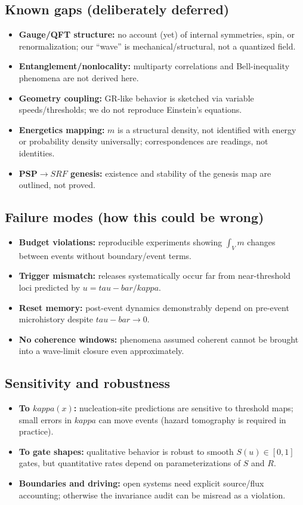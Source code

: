 \documentclass[12pt]{article}
\newcommand{\FoldTime}{\bar{\tau}}
\newcommand{\Threshold}{\kappa}
\newcommand{\Survival}{S}
\newcommand{\Release}{R}
\newcommand{\SRF}{\mathcal{F}_{\mathrm{SR}}}
\def\FoldTime{tau-bar}%
\def\Threshold{kappa}%
\def\SRF{SRF}%
\def\Survival{S}%
\def\Release{R}%
\def\bar#1{#1}%
\def\mathcal#1{#1}%
\def\mathrm#1{#1}%
\begin{document}
\subsection{Known gaps (deliberately deferred)}
\begin{itemize}
  \item \textbf{Gauge/QFT structure:} no account (yet) of internal symmetries, spin, or renormalization; our ``wave'' is mechanical/structural, not a quantized field.
  \item \textbf{Entanglement/nonlocality:} multiparty correlations and Bell-inequality phenomena are not derived here.
  \item \textbf{Geometry coupling:} GR-like behavior is sketched via variable speeds/thresholds; we do not reproduce Einstein's equations.
  \item \textbf{Energetics mapping:} $m$ is a structural density, not identified with energy or probability density universally; correspondences are readings, not identities.
  \item \textbf{PSP$\to\SRF$ genesis:} existence and stability of the genesis map are outlined, not proved.
\end{itemize}

\subsection{Failure modes (how this could be wrong)}
\begin{itemize}
  \item \textbf{Budget violations:} reproducible experiments showing $\int_V m$ changes between events without boundary/event terms.
  \item \textbf{Trigger mismatch:} releases systematically occur far from near-threshold loci predicted by $u=\FoldTime/\Threshold$.
  \item \textbf{Reset memory:} post-event dynamics demonstrably depend on pre-event microhistory despite $\FoldTime\to 0$.
  \item \textbf{No coherence windows:} phenomena assumed coherent cannot be brought into a wave-limit closure even approximately.
\end{itemize}

\subsection{Sensitivity and robustness}
\begin{itemize}
  \item \textbf{To $\Threshold(x)$:} nucleation-site predictions are sensitive to threshold maps; small errors in $\Threshold$ can move events (hazard tomography is required in practice).
  \item \textbf{To gate shapes:} qualitative behavior is robust to smooth $\Survival(u)\in[0,1]$ gates, but quantitative rates depend on parameterizations of $\Survival$ and $\Release$.
  \item \textbf{Boundaries and driving:} open systems need explicit source/flux accounting; otherwise the invariance audit can be misread as a violation.
\end{itemize}
\end{document}
